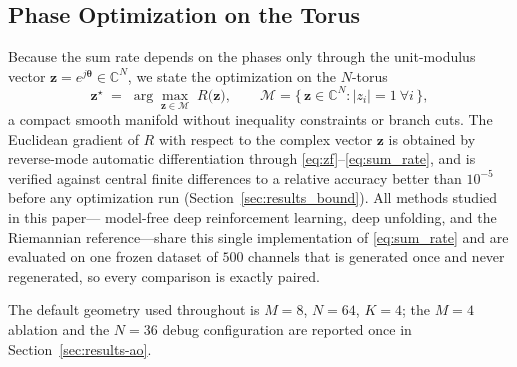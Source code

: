 \subsection{Phase Optimization on the Torus}
Because the sum rate depends on the phases only through the unit-modulus
vector $\boldsymbol{z} = e^{j\boldsymbol{\theta}} \in \mathbb{C}^N$, we state
the optimization on the $N$-torus
\begin{equation}
\boldsymbol{z}^{\star} \;=\; \arg\max_{\boldsymbol{z} \in \mathcal{M}} \;
R\bigl(\boldsymbol{z}\bigr),
\qquad
\mathcal{M} = \bigl\{\, \boldsymbol{z} \in \mathbb{C}^{N} : |z_i| = 1 \ \forall i \,\bigr\},
\label{eq:torus_problem}
\end{equation}
a compact smooth manifold without inequality constraints or branch cuts. The
Euclidean gradient of $R$ with respect to the complex vector
$\boldsymbol{z}$ is obtained by reverse-mode automatic differentiation through
\eqref{eq:zf}--\eqref{eq:sum_rate}, and is verified against central finite
differences to a relative accuracy better than $10^{-5}$ before any optimization
run (Section~\ref{sec:results_bound}). All methods studied in this paper---%
model-free deep reinforcement learning, deep unfolding, and the
Riemannian reference---share this single implementation of
\eqref{eq:sum_rate} and are evaluated on one frozen dataset of $500$ channels
that is generated once and never regenerated, so every comparison is exactly
paired.

\providecommand{\NrisElements}{64}
\providecommand{\NumAntennasBS}{8}
\providecommand{\NumUsers}{4}
The default geometry used throughout is
$M = \NumAntennasBS$, $N = \NrisElements$, $K = \NumUsers$; the $M=4$
ablation and the $N=36$ debug configuration are reported once in
Section~\ref{sec:results-ao}.
